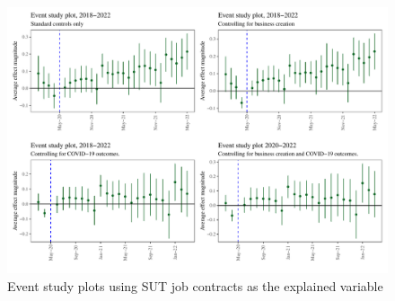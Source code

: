 \documentclass[11pt,a4paper]{article}\usepackage[]{graphicx}\usepackage[]{xcolor}
\makeatletter
\def\maxwidth{ %
  \ifdim\Gin@nat@width>\linewidth
    \linewidth
  \else
    \Gin@nat@width
  \fi
}
\newenvironment{knitrout}{}{} %
\makeatother
\begin{document}
\begin{figure}[h]
\caption{Event study plots using SUT job contracts as the explained variable}
\begin{knitrout}
\color{fgcolor}
\includegraphics[width=\maxwidth]{figure/event-study1-1} 
\end{knitrout}
\end{figure}
\end{document}
